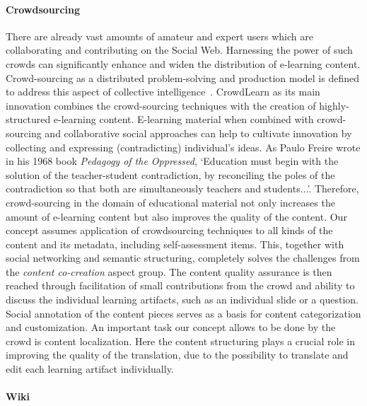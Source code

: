 \documentclass[ngerman,UKenglish,table]{scrbook}
\begin{document}
\paragraph{Crowdsourcing}

There are already vast amounts of amateur and expert users which are collaborating and contributing on the Social Web.
Harnessing the power of such crowds can significantly enhance and widen the distribution of e-learning content.
Crowd-sourcing as a distributed problem-solving and production model is defined to address this aspect of collective intelligence~\cite{Howe2006}.
CrowdLearn as its main innovation combines the crowd-sourcing techniques with the creation of highly-structured e-learning content.
E-learning material when combined with crowd-sourcing and collaborative social approaches can help to cultivate innovation by collecting and expressing (contradicting) individual's ideas.
As Paulo Freire wrote in his 1968 book \emph{Pedagogy of the Oppressed}, `Education must begin with the solution of the teacher-student contradiction, by reconciling the poles of the contradiction so that both are simultaneously teachers and students...'.
Therefore, crowd-sourcing in the domain of educational material not only increases the amount of e-learning content but also improves the quality of the content.
Our concept assumes application of crowdsourcing techniques to all kinds of the content and its metadata, including self-assessment items.
This, together with social networking and semantic structuring, completely solves the challenges from the \emph{content co-creation} aspect group.
The content quality assurance is then reached through facilitation of small contributions from the crowd and ability to discuss the individual learning artifacts, such as an individual slide or a question.
Social annotation of the content pieces serves as a basis for content categorization and customization.
An important task our concept allows to be done by the crowd is content localization.
Here the content structuring plays a crucial role in improving the quality of the translation, due to the possibility to translate and edit each learning artifact individually.


\paragraph{Wiki}
\end{document}

